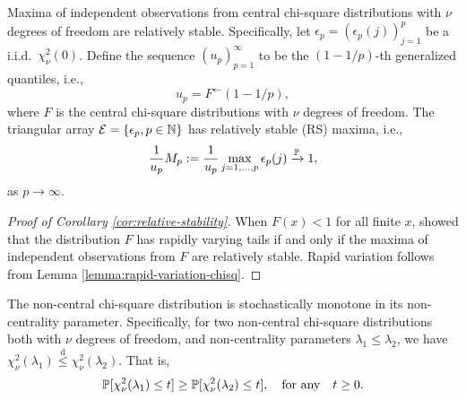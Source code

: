 \begin{corollary} \label{cor:relative-stability}
Maxima of independent observations from central chi-square distributions with $\nu$ degrees of freedom are relatively stable. 
Specifically, let $\epsilon_p = \left(\epsilon_p(j)\right)_{j=1}^p$ be a i.i.d.\ $\chi_\nu^2(0)$. 
Define the sequence $(u_p)_{p=1}^\infty$ to be the $(1-1/p)$-th generalized quantiles, i.e., 
\begin{equation} \label{eq:quantiles}
    u_p = F^\leftarrow(1 - 1/p),
\end{equation}
where $F$ is the central chi-square distributions with $\nu$ degrees of freedom.
The triangular array ${\cal E} = \{\epsilon_p, p\in\mathbb N\}$ has relatively stable (RS) maxima, i.e.,
\begin{equation} \label{eq:RS-condition}
    \frac{1}{u_{p}} M_p := \frac{1}{u_{p}} \max_{j=1,\ldots,p} \epsilon_p(j) \xrightarrow{\P} 1,
\end{equation}
as $p\to\infty$.
\end{corollary}

\begin{proof}[Proof of Corollary \ref{cor:relative-stability}]
When $F(x)<1$ for all finite $x$, \citet{gnedenko1943distribution} showed that the distribution $F$ has rapidly varying tails if and only if the maxima of independent observations from $F$ are relatively stable.
Rapid variation follows from Lemma \ref{lemma:rapid-variation-chisq}.
\end{proof}


\begin{lemma} \label{lemma:stochastic-monotonicity}
The non-central chi-square distribution is stochastically monotone in its non-centrality parameter.
Specifically, for two non-central chi-square distributions both with $\nu$ degrees of freedom, and non-centrality parameters $\lambda_1 \le \lambda_2$, we have $\chi^2_\nu(\lambda_1) \stackrel{\mathrm{d}}{\le} \chi^2_\nu(\lambda_2)$. 
That is,
\begin{equation} \label{eq:stochastic-monotonicity}
    \P[\chi^2_\nu(\lambda_1) \le t] \ge \P[\chi^2_\nu(\lambda_2) \le t], \quad \text{for any}\quad t\ge0.
\end{equation}
\end{lemma}

